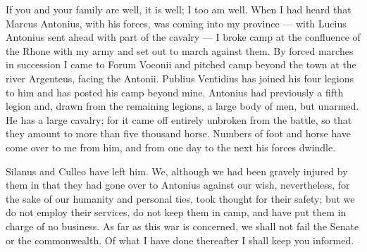 

 If you and your family are well, it is well; I too am well. When I had heard that Marcus Antonius, with his forces, was coming into my province --- with Lucius Antonius sent ahead with part of the cavalry --- I broke camp at the confluence of the Rhone with my army and set out to march against them. By forced marches in succession I came to Forum Voconii and pitched camp beyond the town at the river Argenteus, facing the Antonii. Publius Ventidius has joined his four legions to him and has posted his camp beyond mine. Antonius had previously a fifth legion and, drawn from the remaining legions, a large body of men, but unarmed. He has a large cavalry; for it came off entirely unbroken from the battle, so that they amount to more than five thousand horse. Numbers of foot and horse have come over to me from him, and from one day to the next his forces dwindle.

 Silanus and Culleo have left him. We, although we had been gravely injured by them in that they had gone over to Antonius against our wish, nevertheless, for the sake of our humanity and personal ties, took thought for their safety; but we do not employ their services, do not keep them in camp, and have put them in charge of no business. As far as this war is concerned, we shall not fail the Senate or the commonwealth. Of what I have done thereafter I shall keep you informed.

